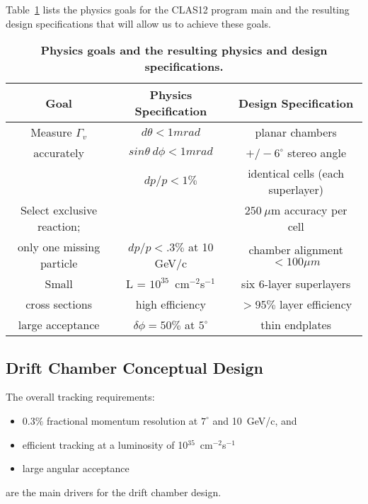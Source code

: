 Table~\ref{fwd-dc-physics-specifications} lists the physics goals for the CLAS12 program
main and the resulting design specifications that will allow us to achieve these goals.


\small{
\begin{table}[ht]
\begin{center}
\begin{tabular}{||c|c|c||} \hline \hline
   {\bf Goal}         & {\bf Physics Specification} & {\bf Design Specification}\\ \hline
Measure $\Gamma_v$  & $d \theta < 1mrad$   & planar chambers \\ 
accurately  & $sin \theta ~d \phi < 1 mrad$ & $+/- 6^\circ$ stereo angle   \\ 
  & $dp/p < 1\% $ & identical cells (each superlayer)  \\ \hline
Select exclusive reaction; &    & $250~\mu$m  accuracy per cell\\ 
only one missing particle    & $dp/p < .3\%$ at 10 GeV/c &    chamber alignment $<100\mu m$\\  \hline
Small       & L = $10^{35}$~cm$^{-2}$s$^{-1}$  & six 6-layer superlayers \\ 
cross sections  & high efficiency & $> 95\%$ layer efficiency \\ \hline
large acceptance   & $\delta\phi = 50\%$ at $5^\circ$ & thin endplates\\ \hline
\end{tabular}
\caption{\small{\bf Physics goals and the resulting physics and design specifications.}}
\label{fwd-dc-physics-specifications}
\end{center}
\end{table}
}

\subsection{Drift Chamber Conceptual Design}

The overall tracking requirements:
\begin{itemize}
\item $0.3\%$ fractional momentum resolution at $7^{\circ}$ and 10~GeV/c, and 
\item efficient tracking at a luminosity of 
10$^{35}$~cm$^{-2}$s$^{-1}$
\item large angular acceptance 
\end{itemize}
are the main drivers for the drift chamber design.  

